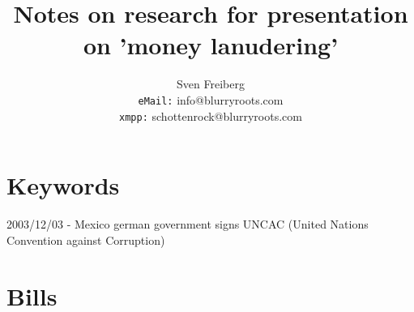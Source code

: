 \documentclass{article}
\begin{document}
\title{Notes on research for presentation on 'money lanudering'}
\author{Sven Freiberg\\
\texttt{eMail:} info@blurryroots.com\\
\texttt{xmpp:} schottenrock@blurryroots.com}
\maketitle

\part[Keywords]{Keywords}
2003/12/03 - Mexico german government signs UNCAC (United Nations Convention against Corruption)


\part[Bills]{Bills}
\end{document}
